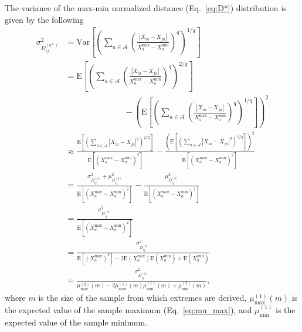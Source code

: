 \documentclass[aos]{imsart}
\begin{document}
The variance of the max-min normalized distance (Eq.~\ref{eq:D*}) distribution is given by the following
%
\begin{equation}\label{eq:max-min_D_var}
\begin{aligned}
\sigma^2_{D^{(q*)}_{ij}} &= \text{Var}\left[\left(\sum_{a \in \mathcal{A}}\left(\frac{|X_{ia} - X_{ja}|}{X^\text{max}_a - X^\text{min}_a}\right)^q\right)^{1/q}\right] \\
&= \text{E}\left[\left(\sum_{a \in \mathcal{A}}\left(\frac{|X_{ia} - X_{ja}|}{X^\text{max}_a - X^\text{min}_a}\right)^q\right)^{2/q}\right] \\
&\hspace{3cm}- \left(\text{E}\left[\left(\sum_{a \in \mathcal{A}}\left(\frac{|X_{ia} - X_{ja}|}{X^\text{max}_a - X^\text{min}_a}\right)^q\right)^{1/q}\right]\right)^2 \\
&\approx \frac{\text{E}\left[\left(\displaystyle \sum_{a \in \mathcal{A}}|X_{ia} - X_{ja}|^q\right)^{2/q}\right]}{\text{E}[(X^\text{max}_a - X^\text{min}_a)^2]} - \frac{\left(\text{E}\left[\left(\displaystyle \sum_{a \in \mathcal{A}}|X_{ia} - X_{ja}|^q\right)^{1/q}\right]\right)^2}{\text{E}[(X^\text{max}_a - X^\text{min}_a)^2]} \\
&= \frac{\sigma^2_{D^{(q)}_{ij}} + \mu^2_{D^{(q)}_{ij}}}{\text{E}[(X^\text{max}_a - X^\text{min}_a)^2]} - \frac{\mu^2_{D^{(q)}_{ij}}}{\text{E}[(X^\text{max}_a - X^\text{min}_a)^2]} \\
&= \frac{\sigma^2_{D^{(q)}_{ij}}}{\text{E}[(X^\text{max}_a - X^\text{min}_a)^2]} \\
&= \frac{\sigma^2_{D^{(q)}_{ij}}}{\text{E}[(X^\text{max}_a)^2] - 2\text{E}(X^\text{max}_a)\text{E}(X^\text{min}_a) + \text{E}(X^\text{min}_a)} \\
&= \frac{\sigma^2_{D^{(q)}_{ij}}}{\mu^{(2)}_\text{max}(m) - 2\mu^{(1)}_\text{max}(m)\mu^{(1)}_\text{min}(m) + \mu^{(2)}_\text{min}(m)},
\end{aligned}
\end{equation}
%
where $m$ is the size of the sample from which extremes are derived, $\mu^{(1)}_\text{max}(m)$ is the expected value of the sample maximum (Eq.~\ref{eq:mu_max}), and $\mu^{(1)}_\text{min}$ is the expected value of the sample minimum.  
\end{document}
